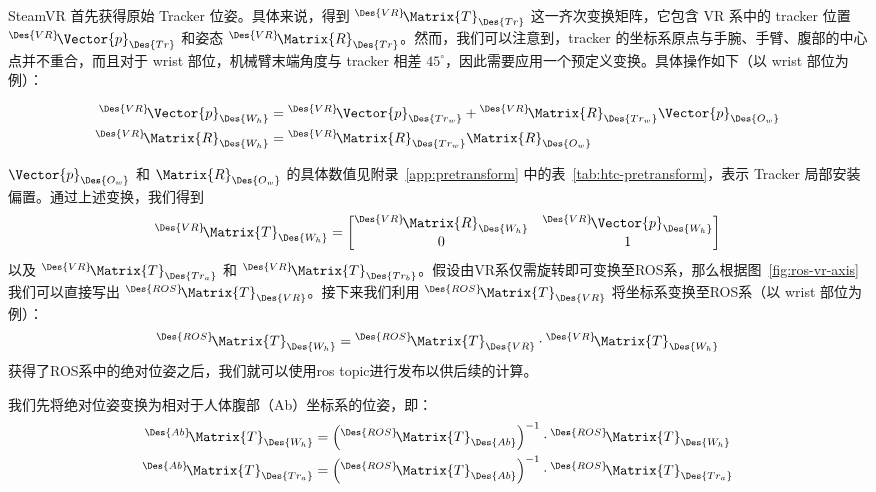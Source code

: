 SteamVR 首先获得原始 Tracker 位姿。具体来说，得到 ${}^{\Des{VR}}\!\Matrix{T}_{\Des{Tr}}$ 这一齐次变换矩阵，它包含 VR 系中的 tracker 位置 ${}^{\Des{VR}}\!\Vector{p}_{\Des{Tr}}$ 和姿态 ${}^{\Des{VR}}\!\Matrix{R}_{\Des{Tr}}$。然而，我们可以注意到，tracker 的坐标系原点与手腕、手臂、腹部的中心点并不重合，而且对于 wrist 部位，机械臂末端角度与 tracker 相差 $45^\circ$，因此需要应用一个预定义变换。具体操作如下（以 wrist 部位为例）：

\begin{align}
    {}^{\Des{VR}}\!\Vector{p}_{\Des{W_h}} &=
    {}^{\Des{VR}}\!\Vector{p}_{\Des{Tr_w}} +
    {}^{\Des{VR}}\!\Matrix{R}_{\Des{Tr_w}}\Vector{p}_{\Des{O_w}} \\
    {}^{\Des{VR}}\!\Matrix{R}_{\Des{W_h}} &=
    {}^{\Des{VR}}\!\Matrix{R}_{\Des{Tr_w}}\Matrix{R}_{\Des{O_w}}
\end{align}

${\Vector{p}_{\Des{O_w}}}$ 和 ${\Matrix{R}_{\Des{O_w}}}$ 的具体数值见附录~\ref{app:pretransform} 中的表~\ref{tab:htc-pretransform}，表示 Tracker 局部安装偏置。通过上述变换，我们得到
\begin{equation}
    {}^{\Des{VR}}\!\Matrix{T}_{\Des{W_h}} =
    \begin{bmatrix}
        {}^{\Des{VR}}\!\Matrix{R}_{\Des{W_h}} & {}^{\Des{VR}}\!\Vector{p}_{\Des{W_h}} \\
        0 & 1
    \end{bmatrix}
\end{equation}
以及 ${}^{\Des{VR}}\!\Matrix{T}_{\Des{Tr_a}}$ 和 ${}^{\Des{VR}}\!\Matrix{T}_{\Des{Tr_b}}$。假设由VR系仅需旋转即可变换至ROS系，那么根据图~\ref{fig:ros-vr-axis}我们可以直接写出 ${}^{\Des{ROS}}\!\Matrix{T}_{\Des{VR}}$。接下来我们利用 ${}^{\Des{ROS}}\!\Matrix{T}_{\Des{VR}}$ 将坐标系变换至ROS系（以 wrist 部位为例）：
\begin{equation}
    {}^{\Des{ROS}}\!\Matrix{T}_{\Des{W_h}} =
    {}^{\Des{ROS}}\!\Matrix{T}_{\Des{VR}} \cdot {}^{\Des{VR}}\!\Matrix{T}_{\Des{W_h}}
\end{equation}
获得了ROS系中的绝对位姿之后，我们就可以使用ros topic进行发布以供后续的计算。

我们先将绝对位姿变换为相对于人体腹部（Ab）坐标系的位姿，即：
\begin{align}
    {}^{\Des{Ab}}\!\Matrix{T}_{\Des{W_h}} &=
    \left({}^{\Des{ROS}}\!\Matrix{T}_{\Des{Ab}}\right)^{-1}
    \cdot {}^{\Des{ROS}}\!\Matrix{T}_{\Des{W_h}} \\
    {}^{\Des{Ab}}\!\Matrix{T}_{\Des{Tr_a}} &=
    \left({}^{\Des{ROS}}\!\Matrix{T}_{\Des{Ab}}\right)^{-1}
    \cdot {}^{\Des{ROS}}\!\Matrix{T}_{\Des{Tr_a}}
\end{align}

